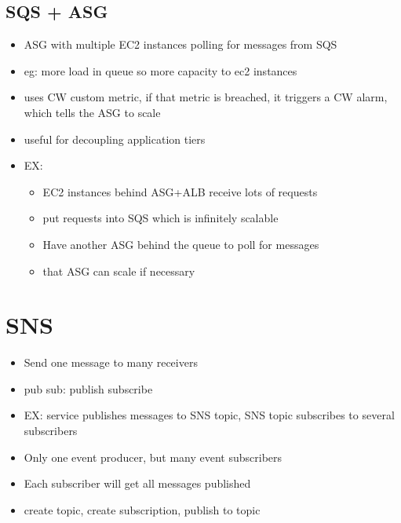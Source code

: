 \documentclass[]{scrartcl}
\begin{document}
\subsection{SQS + ASG}
\begin{itemize}
	\item ASG with multiple EC2 instances polling for messages from SQS
	\item eg: more load in queue so more capacity to ec2 instances
	\item uses CW custom metric, if that metric is breached, it triggers a CW alarm, which tells the ASG to scale
	\item useful for decoupling application tiers
	\item EX:
	\begin{itemize}
		\item EC2 instances behind ASG+ALB receive lots of requests
		\item put requests into SQS which is infinitely scalable
		\item Have another ASG behind the queue to poll for messages
		\item that ASG can scale if necessary
	\end{itemize}
\end{itemize}

\section{SNS}
\begin{itemize}
	\item Send one message to many receivers
	\item pub sub: publish subscribe
	\item EX: service publishes messages to SNS topic, SNS topic subscribes to several subscribers
	\item Only one event producer, but many event subscribers
	\item Each subscriber will get all messages published
	\item create topic, create subscription, publish to topic
\end{itemize}
\end{document}
